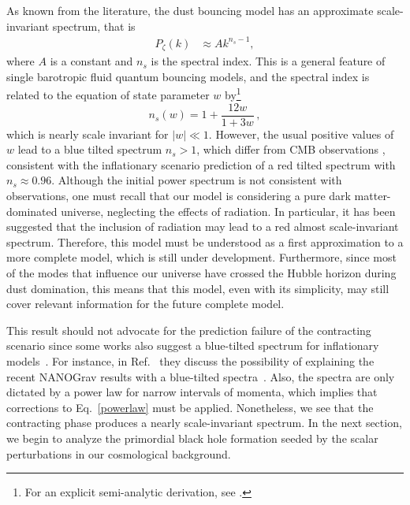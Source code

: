 \documentclass[a4paper,11pt]{article}
\begin{document}
As known from the literature, the dust bouncing model has an approximate scale-invariant
spectrum, that is
\begin{align}
	\label{powerlaw}
	P_{{\zeta}}(k) & \approx A k^{n_s-1}
	,\end{align}
where $A$ is a constant and $n_s$ is the spectral index. This is a general feature of
single barotropic fluid quantum bouncing models, and the spectral index is related to
the equation of state parameter $w$ by\footnote{For an explicit semi-analytic
	derivation, see \cite{nelson_peter_bouncing_original}.}
\begin{equation}
	n_{s}(w) = 1 + \frac{ 12w }{ 1 + 3w }\, ,
\end{equation}
%
which is nearly scale invariant for $|w| \ll 1 $. However, the usual positive values of
$w$ lead to a blue tilted spectrum $n_{s} > 1$, which differ from CMB observations
\cite{planck_inflation_constraints}, consistent with the inflationary scenario
prediction of a red tilted spectrum with $n_{s} \approx 0.96$. Although the initial
power spectrum is not consistent with observations, one must recall that our model is
considering a pure dark matter-dominated universe, neglecting the effects of radiation.
In particular, it has been suggested \cite{nelson2021bouncing} that the inclusion of
radiation may lead to a red almost scale-invariant spectrum. Therefore, this model must
be understood as a first approximation to a more complete model, which is still under
development. Furthermore, since most of the modes that influence our universe have
crossed the Hubble horizon during dust domination, this means that this model, even with
its simplicity, may still cover relevant information for the future complete model.

This result should not advocate for the prediction failure of the contracting scenario
since some works also suggest a blue-tilted spectrum for inflationary
models~\cite{Wang2014, Cai2015}. For instance, in Ref.~\cite{Kuroyanagi2021} they
discuss the possibility of explaining the recent NANOGrav results with a blue-tilted
spectra~\cite{Wu2023}. Also, the spectra are only dictated by a power law for narrow
intervals of momenta, which implies that corrections to Eq.~\eqref{powerlaw} must be
applied. Nonetheless, we see that the contracting phase produces a nearly
scale-invariant spectrum. In the next section, we begin to analyze the primordial black
hole formation seeded by the scalar perturbations in our cosmological background.
\end{document}
